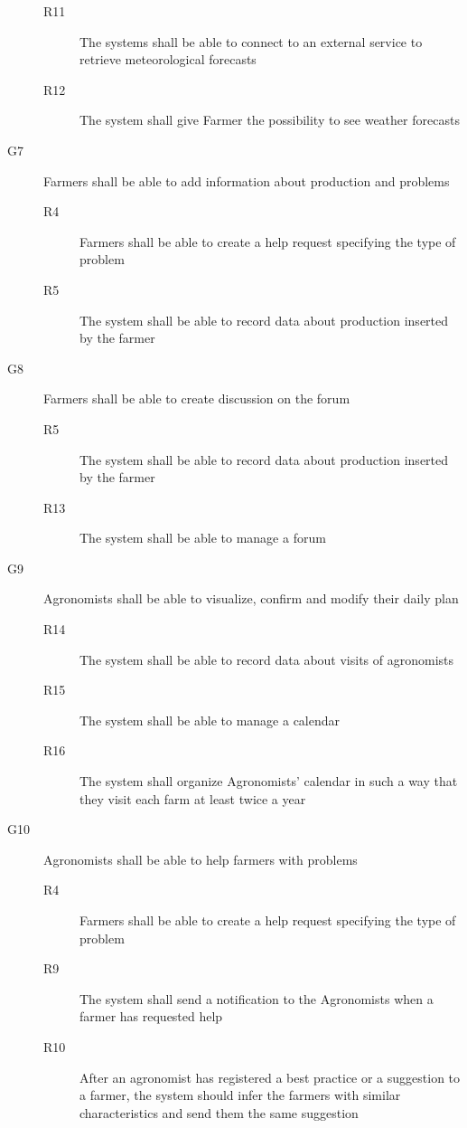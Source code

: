 \begin{description}
\begin{description}
            \item[R11] The systems shall be able to connect to an external service to retrieve meteorological forecasts
            \item[R12] The system shall give Farmer the possibility to see weather forecasts
        \end{description}
    \item [G7] Farmers shall be able to add information about production and problems
        \begin{description}
            \item[R4] Farmers shall be able to create a help request specifying  the type of problem
            \item[R5] The system shall be able to record data about production inserted by the farmer
        \end{description}
    \item [G8] Farmers shall be able to create discussion on the forum
        \begin{description}
            \item[R5] The system shall be able to record data about production inserted by the farmer
            \item[R13] The system shall be able to manage a forum
        \end{description}
    \item [G9] Agronomists shall be able to visualize, confirm and modify their daily plan
        \begin{description}
            \item[R14] The system shall be able to record data about visits of agronomists
            \item[R15] The system shall be able to manage a calendar
            \item[R16] The system shall organize Agronomists' calendar in such a way that they visit each farm at least twice a year
        \end{description}
    \item [G10] Agronomists shall be able to help farmers with problems
    \begin{description}
        \item[R4] Farmers shall be able to create a help request specifying  the type of problem
        \item[R9] The system shall send a notification to the Agronomists when a farmer has requested help
        \item[R10] After an agronomist has registered a best practice or a suggestion to a farmer, the system should infer the farmers with similar characteristics and send them the same suggestion 

\end{description}
\end{description}
